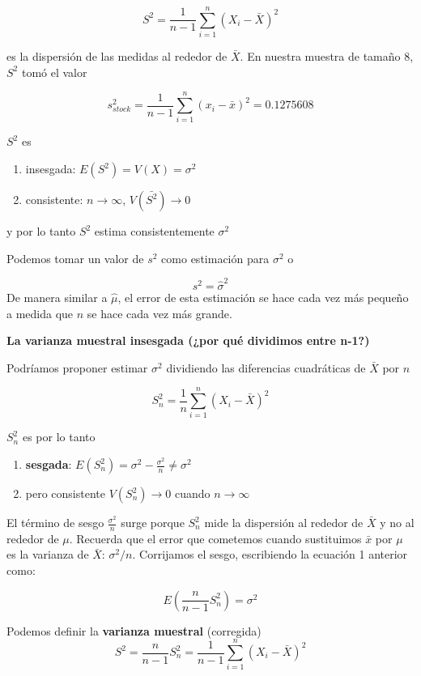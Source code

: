 \documentclass[
]{book}
\providecommand{\tightlist}{%
  \setlength{\itemsep}{0pt}\setlength{\parskip}{0pt}}
\begin{document}
\[S^2= \frac{1}{n-1}\sum_{i=1}^n (X_i-\bar{X})^2\]

es la dispersión de las medidas al rededor de \(\bar{X}\). En nuestra muestra de tamaño \(8\), \(S^2\) tomó el valor

\[s_{stock}^2=\frac{1}{n-1}\sum_{i=1}^n (x_i-\bar{x})^2=0.1275608\]

\(S^2\) es

\begin{enumerate}
\def\labelenumi{\arabic{enumi})}
\tightlist
\item
  insesgada: \(E(S^2)=V(X)=\sigma^2\)
\item
  consistente: \(n \rightarrow \infty\), \(V(\bar{S^2}) \rightarrow 0\)
\end{enumerate}

y por lo tanto \(S^2\) estima consistentemente \(\sigma^2\)

Podemos tomar un valor de \(s^2\) como estimación para \(\sigma^2\) o

\[s^2=\hat{\sigma}^2\]
De manera similar a \(\hat{\mu}\), el error de esta estimación se hace cada vez más pequeño a medida que \(n\) se hace cada vez más grande.

\textbf{La varianza muestral insesgada (¿por qué dividimos entre n-1?)}

Podríamos proponer estimar \(\sigma^2\) dividiendo las diferencias cuadráticas de \(\bar{X}\) por \(n\)

\[S_n^2=\frac{1}{n}\sum_{i=1}^n (X_i-\bar{X})^2\]

\(S_n^2\) es por lo tanto

\begin{enumerate}
\def\labelenumi{\arabic{enumi})}
\tightlist
\item
  \textbf{sesgada}: \(E(S_n^2) = \sigma^2-\frac{\sigma^2}{n} \neq \sigma^2\)
\item
  pero consistente \(V(S_n^2) \rightarrow 0\) cuando \(n\rightarrow \infty\)
\end{enumerate}

El término de sesgo \(\frac{\sigma^2}{n}\) surge porque \(S_n^2\) mide la dispersión al rededor de \(\bar{X}\) y no al rededor de \(\mu\). Recuerda que el error que cometemos cuando sustituimos \(\bar{x}\) por \(\mu\) es la varianza de \(\bar{X}\): \(\sigma^2/n\). Corrijamos el sesgo, escribiendo la ecuación 1 anterior como:

\[E(\frac{n}{n-1}S_n^2)=\sigma^2\]

Podemos definir la \textbf{varianza muestral} (corregida) \[S^2=\frac{n}{n-1}S_n^2=\frac{1}{n-1}\sum_{i=1}^n (X_i-\bar{X})^2\]
\end{document}
